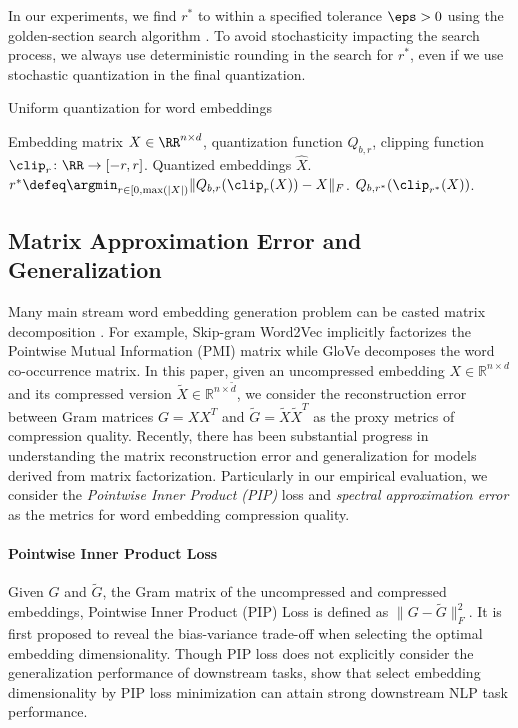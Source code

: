 In our experiments, we find $r^*$ to within a specified tolerance $\eps > 0$ using the golden-section search algorithm \citep{golden53}.
To avoid stochasticity impacting the search process, we always use deterministic rounding in the search for $r^*$, even if we use stochastic quantization in the final quantization.

\begin{algorithm}[tb]
   \caption{Uniform quantization for word embeddings}
   \label{alg:smallfry}
\begin{algorithmic}[1]
	  Embedding matrix $X \in \RR^{n \times d}$, quantization function $Q_{b,r}$, clipping function $\clip_r\colon\RR\rightarrow[-r,r]$.
	 Quantized embeddings $\hat{X}$.
	\STATE $r^* \defeq \argmin_{r \in [0,\max(|X|)} \|Q_{b,r}(\clip_r(X))-X\|_F$.
	 $Q_{b,r^*}(\clip_{r^*}(X))$.
\end{algorithmic}
\end{algorithm}


\subsection{Matrix Approximation Error and Generalization}
Many main stream word embedding generation problem can be casted matrix decomposition \citep{levy2014neural}. For example, Skip-gram Word2Vec \citep{word2vec13} implicitly factorizes the Pointwise Mutual Information (PMI) matrix while GloVe \citep{glove14} decomposes the word co-occurrence matrix. In this paper, given an uncompressed embedding $X\in\mathbb{R}^{n\times d}$ and its compressed version $\tilde{X}\in\mathbb{R}^{n\times \tilde{d}}$, we consider the reconstruction error between Gram matrices $G = XX^T$ and $\tilde{G} = \tilde{X}\tilde{X}^T$ as the proxy metrics of compression quality. Recently, there has been substantial progress in understanding the matrix reconstruction error and generalization for models derived from matrix factorization. Particularly in our empirical evaluation, we consider the \emph{Pointwise Inner Product (PIP)} loss \citep{yin18} and \emph{spectral approximation error} \citep{avron17,lprff18} as the metrics for word embedding compression quality. 

\paragraph{Pointwise Inner Product Loss}
Given $G$ and $\tilde{G}$, the Gram matrix of the uncompressed and compressed embeddings, Pointwise Inner Product (PIP) Loss is defined as $\|G - \tilde{G}\|_F^2$. It is first proposed to reveal the bias-variance trade-off when selecting the optimal embedding dimensionality. Though PIP loss does not explicitly consider the generalization performance of downstream tasks,  \citet{yin18} show that select embedding dimensionality by PIP loss minimization can attain strong downstream NLP task performance.



